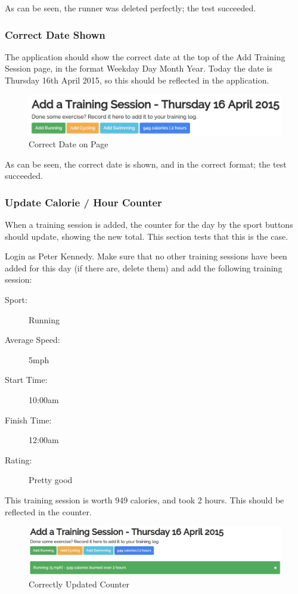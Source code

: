 \documentclass{article}[12pt,a4paper]
\begin{document}
As can be seen, the runner was deleted perfectly; the test succeeded.

\clearpage

\subsubsection{Correct Date Shown}
The application should show the correct date at the top of the Add Training Session page, in the format Weekday Day Month Year. Today the date is Thursday 16th April 2015, so this should be reflected in the application.

\begin{figure}[h!]
    \includegraphics[scale=0.40]{images/testing/add_activity/current_date}
    \caption{Correct Date on Page}
\end{figure}

As can be seen, the correct date is shown, and in the correct format; the test succeeded.

\subsubsection{Update Calorie / Hour Counter}
When a training session is added, the counter for the day by the sport buttons should update, showing the new total. This section tests that this is the case.

Login as Peter Kennedy. Make sure that no other training sessions have been added for this day (if there are, delete them) and add the following training session:

\begin{description}
  \item[Sport:] Running
  \item[Average Speed:] 5mph
  \item[Start Time:] 10:00am
  \item[Finish Time:] 12:00am
  \item[Rating:] Pretty good
\end{description}

This training session is worth 949 calories, and took 2 hours. This should be reflected in the counter.

\begin{figure}[h!]
    \includegraphics[scale=0.33]{images/testing/add_activity/counter_update}
    \caption{Correctly Updated Counter}
\end{figure}
\end{document}
